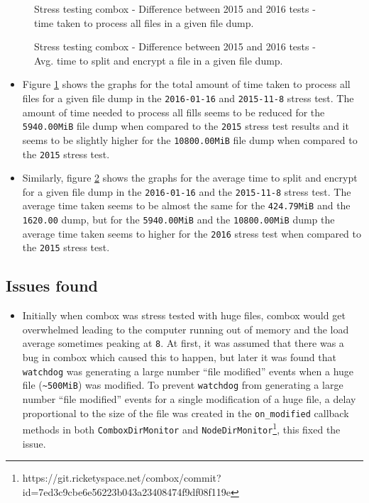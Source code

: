 \begin{figure}[h]
\centering

\caption{Stress testing combox - Difference between 2015 and 2016 tests - time taken to process all files in a given file dump.}
\label{fig:4-st-tt-diff}
\end{figure}

\begin{figure}[h]
\centering

\caption{Stress testing combox - Difference between 2015 and 2016 tests - Avg. time to split and encrypt a file in a given file dump.}
\label{fig:4-st-atsae-diff}
\end{figure}

\begin{itemize}
\item Figure \ref{fig:4-st-tt-diff} shows the graphs for the total
  amount of time taken to process all files for a given file dump in
  the \verb+2016-01-16+ and \verb+2015-11-8+ stress test. The amount
  of time needed to process all fills seems to be reduced for the
  \verb+5940.00MiB+ file dump when compared to the \verb+2015+
  stress test results and it seems to be slightly higher for the
  \verb+10800.00MiB+ file dump when compared to the \verb+2015+
  stress test.
\item Similarly, figure \ref{fig:4-st-atsae-diff} shows the graphs for
  the average time to split and encrypt for a given file dump in the
  \verb+2016-01-16+ and the \verb+2015-11-8+ stress test. The average
  time taken seems to be almost the same for the \verb+424.79MiB+
  and the \verb+1620.00+ dump, but for the \verb+5940.00MiB+
  and the \verb+10800.00MiB+ dump the average time taken seems to
  higher for the \verb+2016+ stress test when compared to the
  \verb+2015+ stress test.
\end{itemize}

\subsection{Issues found}\label{4-st-if}

\begin{itemize}
\item Initially when combox was stress tested with huge files, combox
  would get overwhelmed leading to the computer running out of memory
  and the load average sometimes peaking at \verb+8+. At first, it was
  assumed that there was a bug in combox which caused this to happen,
  but later it was found that \verb+watchdog+\cite{pylib:watchdog} was
  generating a large number ``file modified'' events when a huge file
  (\verb+~500MiB+) was modified. To prevent \verb+watchdog+ from
  generating a large number ``file modified'' events for a single
  modification of a huge file, a delay proportional to the size of the
  file was created in the \verb+on_modified+ callback methods in both
  \verb+ComboxDirMonitor+ and
  \verb+NodeDirMonitor+\footnote{https://git.ricketyspace.net/combox/commit?id=7ed3c9cbe6e56223b043a23408474f9df08f119e},
  this fixed the issue.
\end{itemize}